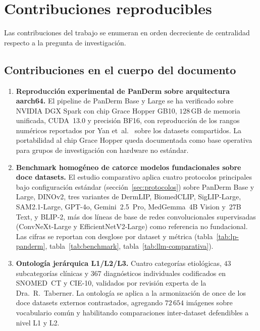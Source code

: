 \section{Contribuciones reproducibles}
\label{sec:contribuciones}

Las contribuciones del trabajo se enumeran en orden decreciente
de centralidad respecto a la pregunta de investigación.

\subsection{Contribuciones en el cuerpo del documento}
\label{sec:contrib-cuerpo}

\begin{enumerate}
\item \textbf{Reproducción experimental de PanDerm sobre
arquitectura aarch64.} El pipeline de PanDerm Base y Large se ha
verificado sobre NVIDIA DGX Spark con chip Grace Hopper GB10,
$128$\,GB de memoria unificada, CUDA~13.0 y precisión BF16, con
reproducción de los rangos numéricos reportados por
Yan et~al.~\cite{panderm2025} sobre los datasets compartidos. La
portabilidad al chip Grace Hopper queda documentada como base
operativa para grupos de investigación con hardware no estándar.

\item \textbf{Benchmark homogéneo de catorce modelos fundacionales
sobre doce datasets.} El estudio comparativo aplica cuatro
protocolos principales bajo configuración estándar
(sección~\ref{sec:protocolos}) sobre PanDerm Base y Large, DINOv2,
tres variantes de DermLIP, BiomedCLIP, SigLIP-Large, SAM2.1-Large,
GPT-4o, Gemini~2.5~Pro, MedGemma~4B Vision y~27B Text, y BLIP-2, más
dos líneas de base de redes convolucionales supervisadas
(ConvNeXt-Large y EfficientNetV2-Large) como referencia no
fundacional. Las cifras se reportan
con desglose por dataset y métrica
(tabla~\ref{tab:lp-panderm}, tabla~\ref{tab:benchmark},
tabla~\ref{tab:llm-comparativa}).

\item \textbf{Ontología jerárquica L1/L2/L3.} Cuatro categorías
etiológicas, $43$ subcategorías clínicas y $367$
diagnósticos individuales codificados en SNOMED~CT y CIE-10,
validados por revisión experta de la Dra.~R.~Taberner. La
ontología se aplica a la armonización de once de los doce
datasets externos contrastados, agregando $72\,654$ imágenes
sobre vocabulario común y habilitando comparaciones inter-dataset
defendibles a nivel L1 y L2.


\end{enumerate}
